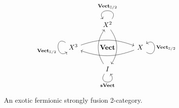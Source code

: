 \documentclass[pdftex]{sigma}
\numberwithin{equation}{section}
\begin{document}
\begin{figure}[!hbt]\vspace{-5mm}
$$\begin{tikzcd}
& X^2 \arrow[dd, bend left=35] \arrow["\mathbf{Vect}_{\mathbb{Z}/2}"', loop, distance=2em, in=125, out=55] &\\
X^3 \arrow[rr, bend left = 20] \arrow["\mathbf{Vect}_{\mathbb{Z}/2}"', loop, distance=2em, in=215, out=145] & \mathbf{Vect}& X \arrow[ll, bend left = 20] \arrow["\mathbf{Vect}_{\mathbb{Z}/2}"', loop, distance=2em, in=35, out=325] \\
& I \arrow[uu, bend left=35] \arrow["\mathbf{sVect}"', loop, distance=2em, in=305, out=235] &
\end{tikzcd}$$
\caption{An exotic fermionic strongly fusion 2-category.}
\label{fig:exoticFSF2C}
\end{figure}
\end{document}
